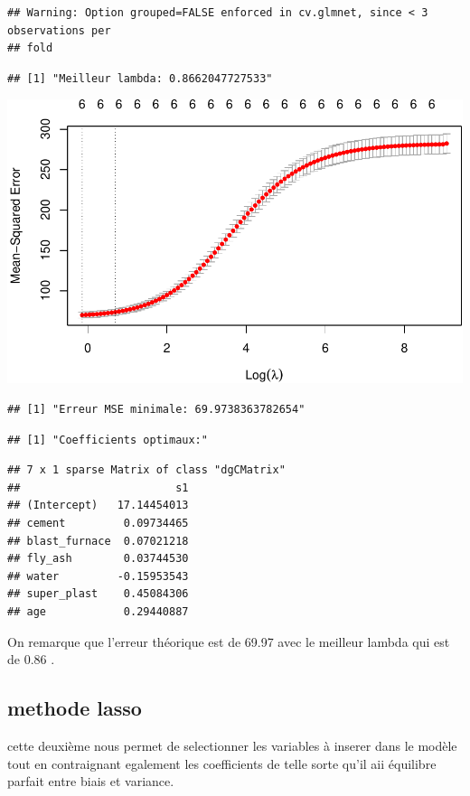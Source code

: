 \documentclass[
  12pt,
]{article}
\begin{document}
\begin{verbatim}
## Warning: Option grouped=FALSE enforced in cv.glmnet, since < 3 observations per
## fold
\end{verbatim}

\begin{verbatim}
## [1] "Meilleur lambda: 0.8662047727533"
\end{verbatim}

\includegraphics{rmd_final_files/figure-latex/unnamed-chunk-62-2.pdf}

\begin{verbatim}
## [1] "Erreur MSE minimale: 69.9738363782654"
\end{verbatim}

\begin{verbatim}
## [1] "Coefficients optimaux:"
\end{verbatim}

\begin{verbatim}
## 7 x 1 sparse Matrix of class "dgCMatrix"
##                        s1
## (Intercept)   17.14454013
## cement         0.09734465
## blast_furnace  0.07021218
## fly_ash        0.03744530
## water         -0.15953543
## super_plast    0.45084306
## age            0.29440887
\end{verbatim}

On remarque que l'erreur théorique est de 69.97 avec le meilleur lambda
qui est de 0.86 .

\subsection{methode lasso}\label{methode-lasso}

cette deuxième nous permet de selectionner les variables à inserer dans
le modèle tout en contraignant egalement les coefficients de telle sorte
qu'il aii équilibre parfait entre biais et variance.
\end{document}
